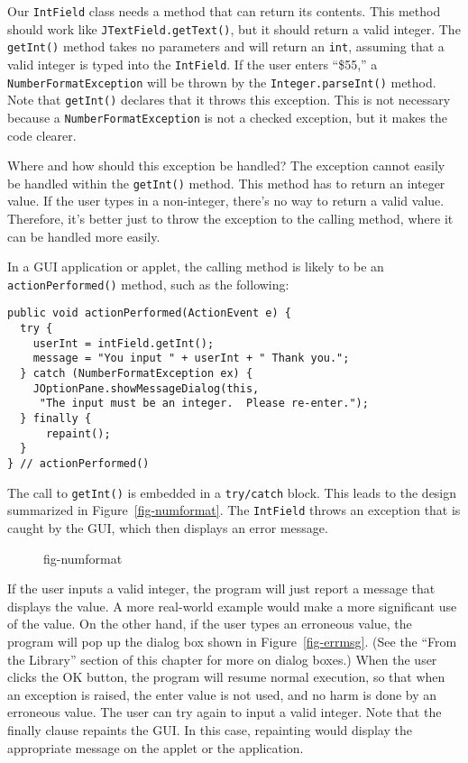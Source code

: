 Our {\tt IntField} class needs a method that can return its
contents.  This method should work like {\tt JTextField.getText()}, but
it should return a valid integer.  The {\tt getInt()} method takes no
parameters and will return an {\tt int}, assuming that a valid integer
is typed into the {\tt IntField}.  If the user enters ``\$55,'' a
{\tt NumberFormatException} will be thrown by the {\tt Integer.parseInt()}
method.  Note that {\tt getInt()} declares that it throws this
exception.  This is not necessary because a {\tt NumberFormatException}
is not a checked exception, but it makes the code clearer.

Where and how should this exception be handled? The exception cannot
easily be handled within the {\tt getInt()} method.  This method has to
return an integer value.  If the user types in a non-integer, there's
no way to return a valid value.  Therefore, it's better just to throw
the exception to the calling method, where it can be handled more
easily.


In a GUI application or applet, the calling method is likely to be
an {\tt actionPerformed()} method, such as the following:

\begin{jjjlisting}
\begin{lstlisting}
public void actionPerformed(ActionEvent e) {
  try {
    userInt = intField.getInt();
    message = "You input " + userInt + " Thank you.";
  } catch (NumberFormatException ex) {
    JOptionPane.showMessageDialog(this,
     "The input must be an integer.  Please re-enter.");
  } finally {
      repaint();
  }
} // actionPerformed()
\end{lstlisting}
\end{jjjlisting}

\noindent The call to {\tt getInt()} is embedded in a {\tt try/catch}
block.  This leads to the design summarized in 
Figure~\ref{fig-numformat}.  The {\tt IntField} throws an exception that
is caught by the GUI, which then displays an error message.

\begin{figure}[h]
{fig-numformat}

\end{figure}

If the user inputs a valid integer, the program will just report a
message that displays the value.  A more real-world example would make
a more significant use of the value.  On the other hand, if the user
types an erroneous value, the program will pop up the dialog box shown
in Figure~\ref{fig-errmsg}. (See the ``From the Library'' section of
this chapter for more on dialog boxes.) When the user clicks the OK
button, the program will resume normal execution, so that when an
exception is raised, the enter value is not used, and no harm is done
by an erroneous value.  The user can try again to input a valid
integer.  Note that the finally clause repaints the GUI.  In this
case, repainting would display the appropriate message on the applet
or the application.

